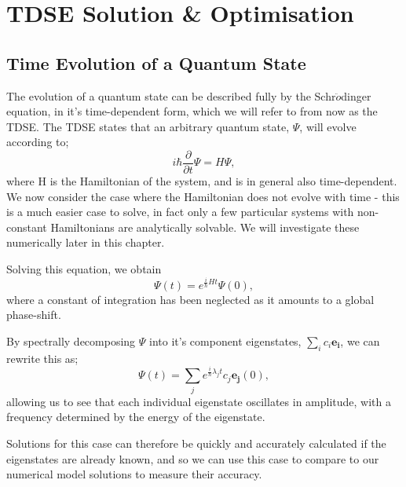 
\chapter{TDSE Solution \& Optimisation} %

\label{Chapter3} %



\section{Time Evolution of a Quantum State}
The evolution of a quantum state can be described fully by the Schr$\ddot{o}$dinger equation, in it's time-dependent form, which we will refer to from now as the TDSE. The TDSE states that an arbitrary quantum state, $\Psi$, will evolve according to;
$$ 
i \hbar \frac{\partial}{\partial t} \Psi=H \Psi,
$$
where H is the Hamiltonian of the system, and is in general also time-dependent. We now consider the case where the Hamiltonian does not evolve with time - this is a much easier case to solve, in fact only a few particular systems with non-constant Hamiltonians are analytically solvable. We will investigate these numerically later in this chapter.

Solving this equation, we obtain 
$$
\Psi\left(t\right) = e^{\frac{i}{\hbar}Ht}\Psi\left(0\right),
$$
where a constant of integration has been neglected as it amounts to a global phase-shift.

By spectrally decomposing $\Psi$ into it's component eigenstates, $\sum_{i}{c_{i}\mathbf{e_{i}}}$, we can rewrite this as;
$$
\Psi\left(t\right) = \sum_{j}{e^{\frac{i}{\hbar}\lambda_{j}t}c_{j}\mathbf{e_{j}}\left(0\right)},
$$
allowing us to see that each individual eigenstate oscillates in amplitude, with a frequency determined by the energy of the eigenstate.

Solutions for this case can therefore be quickly and accurately calculated if the eigenstates are already known, and so we can use this case to compare to our numerical model solutions to measure their accuracy.


